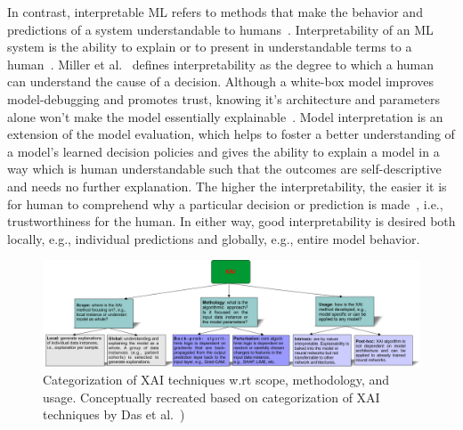 \hspace*{3.5mm} In contrast, interpretable ML refers to methods that make the behavior and predictions of a system understandable to humans~\cite{molnar2019interpretable}. 
Interpretability of an ML system is the ability to explain or to present in understandable terms to a human~\cite{doshi2017towards}. Miller et al.~\cite{XAI_miller} defines interpretability as the degree to which a human can understand the cause of a decision. Although a white-box model improves model-debugging and promotes trust, knowing it's architecture and parameters alone won't make the model essentially explainable~\cite{das2020opportunities}.  
Model interpretation is an extension of the model evaluation, which helps to foster a better understanding of a model’s learned decision policies and gives the ability to explain a model in a way which is human understandable such that the outcomes are self-descriptive and needs no further explanation. 
The higher the interpretability, the easier it is for human to comprehend why a particular decision or prediction is made~\cite{stiglic2020interpretability,bhatt2020explainable}, i.e., trustworthiness for the human. In either way, good interpretability is desired both locally, e.g., individual predictions and globally, e.g., entire model behavior. 

\begin{figure}[h]
	\centering
	\includegraphics[scale=0.55]{images/xai_tec.png}	
    \caption[Categorization of XAI techniques]{Categorization of XAI techniques w.rt scope, methodology, and usage. Conceptually recreated based on categorization of XAI techniques by Das et al.~\cite{das2020opportunities})}	
	\label{fig:survey_xai}
\end{figure}

